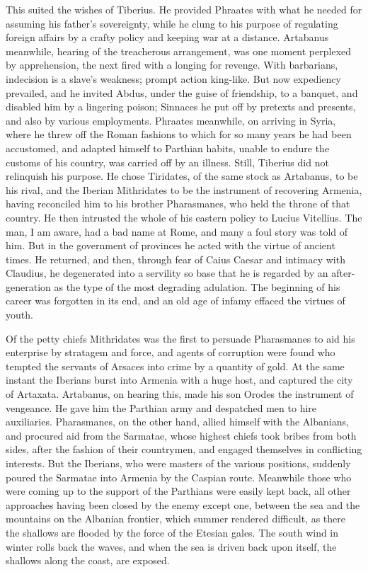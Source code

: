 This suited the wishes of Tiberius. He provided Phraates with what he needed for assuming his father's sovereignty, while he clung to his purpose of regulating foreign affairs by a crafty policy and keeping war at a distance. Artabanus meanwhile, hearing of the treacherous arrangement, was one moment perplexed by apprehension, the next fired with a longing for revenge. With barbarians, indecision is a slave's weakness; prompt action king-like. But now expediency prevailed, and he invited Abdus, under the guise of friendship, to a banquet, and disabled him by a lingering poison; Sinnaces he put off by pretexts and presents, and also by various employments. Phraates meanwhile, on arriving in Syria, where he threw off the Roman fashions to which for so many years he had been accustomed, and adapted himself to Parthian habits, unable to endure the customs of his country, was carried off by an illness. Still, Tiberius did not relinquish his purpose. He chose Tiridates, of the same stock as Artabanus, to be his rival, and the Iberian Mithridates to be the instrument of recovering Armenia, having reconciled him to his brother Pharasmanes, who held the throne of that country. He then intrusted the whole of his eastern policy to Lucius Vitellius. The man, I am aware, had a bad name at Rome, and many a foul story was told of him. But in the government of provinces he acted with the virtue of ancient times. He returned, and then, through fear of Caius Caesar and intimacy with Claudius, he degenerated into a servility so base that he is regarded by an after-generation as the type of the most degrading adulation. The beginning of his career was forgotten in its end, and an old age of infamy effaced the virtues of youth.


Of the petty chiefs Mithridates was the first to persuade Pharasmanes to aid his enterprise by stratagem and force, and agents of corruption were found who tempted the servants of Arsaces into crime by a quantity of gold. At the same instant the Iberians burst into Armenia with a huge host, and captured the city of Artaxata. Artabanus, on hearing this, made his son Orodes the instrument of vengeance. He gave him the Parthian army and despatched men to hire auxiliaries. Pharasmanes, on the other hand, allied himself with the Albanians, and procured aid from the Sarmatae, whose highest chiefs took bribes from both sides, after the fashion of their countrymen, and engaged themselves in conflicting interests. But the Iberians, who were masters of the various positions, suddenly poured the Sarmatae into Armenia by the Caspian route. Meanwhile those who were coming up to the support of the Parthians were easily kept back, all other approaches having been closed by the enemy except one, between the sea and the mountains on the Albanian frontier, which summer rendered difficult, as there the shallows are flooded by the force of the Etesian gales. The south wind in winter rolls back the waves, and when the sea is driven back upon itself, the shallows along the coast, are exposed.


